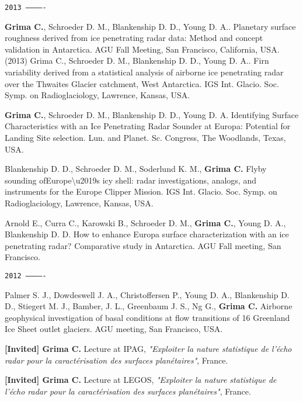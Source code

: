 \begin{etaremune}
\hspace{-2em}\texttt{2013 -------------}

\item
  \textbf{Grima C.}, Schroeder D. M., Blankenship D. D., Young D. A..
  Planetary surface roughness derived from ice penetrating radar data:
  Method and concept validation in Antarctica. AGU Fall Meeting, San
  Francisco, California, USA. (2013) Grima C., Schroeder D. M.,
  Blankenship D. D., Young D. A.. Firn variability derived from a
  statistical analysis of airborne ice penetrating radar over the
  Thwaites Glacier catchment, West Antarctica. IGS Int. Glacio. Soc.
  Symp. on Radioglaciology, Lawrence, Kansas, USA.
\item
  \textbf{Grima C.}, Schroeder D. M., Blankenship D. D., Young D. A.
  Identifying Surface Characteristics with an Ice Penetrating Radar
  Sounder at Europa: Potential for Landing Site selection. Lun. and
  Planet. Sc. Congress, The Woodlands, Texas, USA.
\item
  Blankenship D. D., Schroeder D. M., Soderlund K. M., \textbf{Grima C.}
  Flyby sounding ofEurope\textbackslash{}u2019s icy shell: radar
  investigations, analogs, and instruments for the Europe Clipper
  Mission. IGS Int. Glacio. Soc. Symp. on Radioglaciology, Lawrence,
  Kansas, USA.
\item
  Arnold E., Curra C., Karowski B., Schroeder D. M., \textbf{Grima C.},
  Young D. A., Blankenship D. D. How to enhance Europa surface
  characterization with an ice penetrating radar? Comparative study in
  Antarctica. AGU Fall meeting, San Francisco.

\hspace{-2em}\texttt{2012 -------------}

\item
  Palmer S. J., Dowdeswell J. A., Christoffersen P., Young D. A.,
  Blankenship D. D., Stiegert M. J., Bamber, J. L., Greenbaum J. S., Ng
  G., \textbf{Grima C.} Airborne geophysical investigation of basal
  conditions at flow transitions of 16 Greenland Ice Sheet outlet
  glaciers. AGU meeting, San Francisco, USA.
\item
  \textbf{{[}Invited{]} Grima C.} Lecture at IPAG, \emph{"Exploiter la
  nature statistique de l'écho radar pour la caractérisation des
  surfaces planétaires"}, France.
\item
  \textbf{{[}Invited{]} Grima C.} Lecture at LEGOS, \emph{"Exploiter la
  nature statistique de l'écho radar pour la caractérisation des
  surfaces planétaires"}, France.


\end{etaremune}
